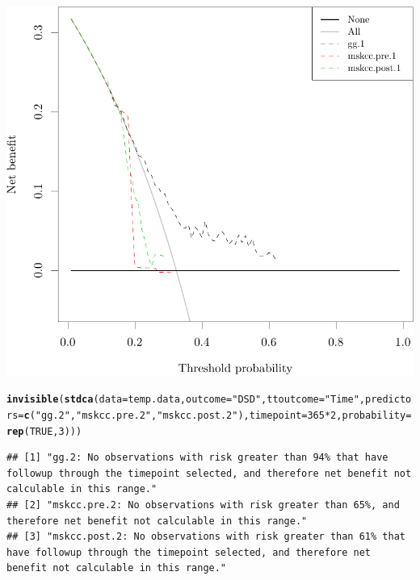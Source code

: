 \documentclass{article}\usepackage[]{graphicx}\usepackage[]{color}
\makeatletter
\def\maxwidth{ %
  \ifdim\Gin@nat@width>\linewidth
    \linewidth
  \else
    \Gin@nat@width
  \fi
}
\newcommand{\hlnum}[1]{\textcolor[rgb]{0.686,0.059,0.569}{#1}}%
\newcommand{\hlstr}[1]{\textcolor[rgb]{0.192,0.494,0.8}{#1}}%
\newcommand{\hlopt}[1]{\textcolor[rgb]{0,0,0}{#1}}%
\newcommand{\hlstd}[1]{\textcolor[rgb]{0.345,0.345,0.345}{#1}}%
\newcommand{\hlkwc}[1]{\textcolor[rgb]{0.333,0.667,0.333}{#1}}%
\newcommand{\hlkwd}[1]{\textcolor[rgb]{0.737,0.353,0.396}{\textbf{#1}}}%
\newenvironment{kframe}{%
 \def\at@end@of@kframe{}%
 \ifinner\ifhmode%
  \def\at@end@of@kframe{\end{minipage}}%
  \begin{minipage}{\columnwidth}%
 \fi\fi%
 \def\FrameCommand##1{\hskip\@totalleftmargin \hskip-\fboxsep
 \colorbox{shadecolor}{##1}\hskip-\fboxsep
     \hskip-\linewidth \hskip-\@totalleftmargin \hskip\columnwidth}%
 \MakeFramed {\advance\hsize-\width
   \@totalleftmargin\z@ \linewidth\hsize
   \@setminipage}}%
 {\par\unskip\endMakeFramed%
 \at@end@of@kframe}
\newenvironment{knitrout}{}{} %
\makeatother
\begin{document}
\begin{knitrout}
{\centering \includegraphics[width=\maxwidth]{figure/07-model-selection-dca-1} 

}


\begin{kframe}\begin{alltt}
\hlkwd{invisible}\hlstd{(}\hlkwd{stdca}\hlstd{(}\hlkwc{data} \hlstd{= temp.data,} \hlkwc{outcome} \hlstd{=} \hlstr{"DSD"}\hlstd{,} \hlkwc{ttoutcome} \hlstd{=} \hlstr{"Time"}\hlstd{,} \hlkwc{predictors} \hlstd{=} \hlkwd{c}\hlstd{(}\hlstr{"gg.2"}\hlstd{,} \hlstr{"mskcc.pre.2"}\hlstd{,} \hlstr{"mskcc.post.2"}\hlstd{),} \hlkwc{timepoint} \hlstd{=} \hlnum{365}\hlopt{*}\hlnum{2}\hlstd{,} \hlkwc{probability} \hlstd{=} \hlkwd{rep}\hlstd{(}\hlnum{TRUE}\hlstd{,} \hlnum{3}\hlstd{)))}
\end{alltt}
\begin{verbatim}
## [1] "gg.2: No observations with risk greater than 94% that have followup through the timepoint selected, and therefore net benefit not calculable in this range."        
## [2] "mskcc.pre.2: No observations with risk greater than 65%, and therefore net benefit not calculable in this range."                                                   
## [3] "mskcc.post.2: No observations with risk greater than 61% that have followup through the timepoint selected, and therefore net benefit not calculable in this range."
\end{verbatim}
\end{kframe}


\end{knitrout}
\end{document}
